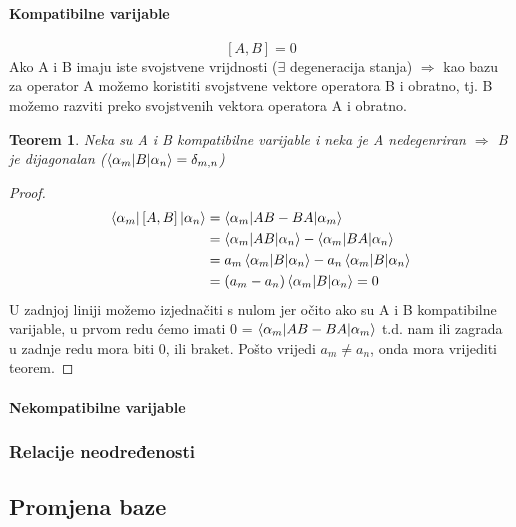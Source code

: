 \documentclass{article}
\newtheorem{theorem}{Teorem}[section]
\newtheorem{proof}{Dokaz}[section]
\numberwithin{equation}{section}
\begin{document}
\paragraph{Kompatibilne varijable} 

\begin{equation}
	\left[A,B\right] = 0
\end{equation}
Ako A i B imaju iste svojstvene vrijdnosti ($\exists$ degeneracija stanja) $\Rightarrow$ kao bazu za operator 
A možemo koristiti svojstvene vektore operatora B i obratno, tj. B možemo razviti preko svojstvenih vektora operatora A i obratno.
\begin{theorem}
	Neka su A i B kompatibilne varijable i neka je A nedegenriran $\Rightarrow$ B je dijagonalan ($\braket{\alpha_m|B|\alpha_n} = \delta_{m,n}$)
\end{theorem}
\begin{proof}
	\begin{equation}
		\begin{aligned}
			\braket{\alpha_m|\left[A,B\right]|\alpha_n} &= \braket{\alpha_m|AB-BA|\alpha_m}\\
																									&=\braket{\alpha_m|AB|\alpha_n} - \braket{\alpha_m|BA|\alpha_n}\\
																									&= a_m \braket{\alpha_m|B|\alpha_n} - a_n\braket{\alpha_m|B|\alpha_n}\\
																									&=\left(a_m - a_n \right) \braket{\alpha_m|B|\alpha_n} = 0
		\end{aligned}
	\end{equation}
	U zadnjoj liniji možemo izjednačiti s nulom jer očito ako su A i B kompatibilne varijable, u prvom redu ćemo imati 0 = $\braket{\alpha_m|AB-BA|\alpha_m}$
	t.d. nam ili zagrada u zadnje redu mora biti 0, ili braket. Pošto vrijedi $a_m \ne a_n$, onda mora vrijediti teorem.
\end{proof}



\paragraph{Nekompatibilne varijable}

\subsubsection{Relacije neodređenosti}

\subsection{Promjena baze}
\end{document}
